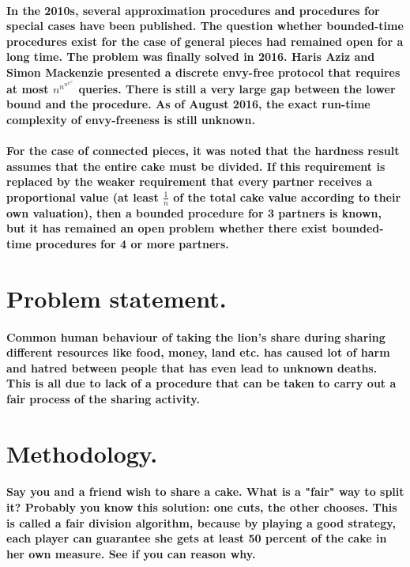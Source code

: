 \documentclass[12pt]{report}
\begin{document}
	\paragraph{In the 2010s, several approximation procedures and procedures for special cases have been published. The question whether bounded-time procedures exist for the case of general pieces had remained open for a long time. The problem was finally solved in 2016. Haris Aziz and Simon Mackenzie presented a discrete envy-free protocol that requires \\
		at most ${\displaystyle n^{n^{n^{n^{n^{n}}}}}}$ queries. There is still a very large gap between the lower bound and the procedure. As of August 2016, the exact run-time complexity of envy-freeness is still unknown. }
	\paragraph{For the case of connected pieces, it was noted that the hardness result assumes that the entire cake must be divided. If this requirement is replaced by the weaker requirement that every partner receives a proportional value (at least $\frac{1}{n}$ of the total cake value according to their own valuation), then a bounded procedure for 3 partners is known, but it has remained an open problem whether there exist bounded-time procedures for 4 or more partners.
	}
	\section{Problem statement.}
	\paragraph{Common human behaviour of taking the lion's share during sharing different resources like food, money, land etc. has caused lot of harm and hatred between people that has even lead to unknown deaths. This is all due to lack of a procedure that can be taken to carry out a fair process of the sharing activity. }

	\section{Methodology.}
	\paragraph{Say you and a friend wish to share a cake. What is a "fair" way to split it? Probably you know this solution: one cuts, the other chooses. This is called a fair division algorithm, because by playing a good strategy, each player can guarantee she gets at least 50 percent of the cake in her own measure. See if you can reason why.}
\end{document}
